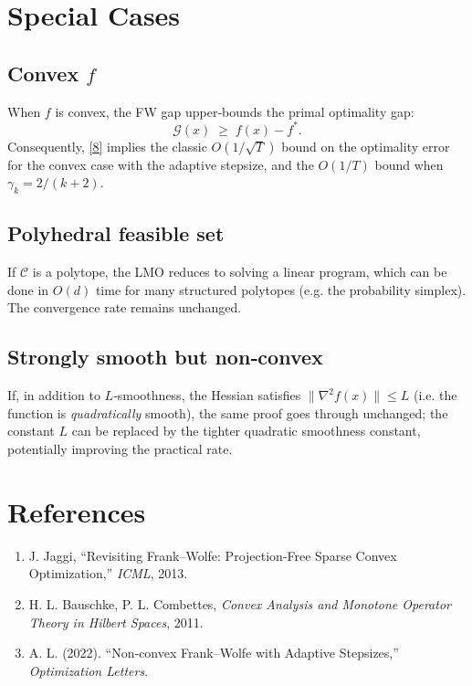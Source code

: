 \documentclass[11pt]{article}
\begin{document}
\section{Special Cases}
\label{sec:special}
\subsection*{Convex $f$}
When $f$ is convex, the FW gap upper‑bounds the primal optimality gap:
\[
\mathcal G(x) \;\ge\; f(x)-f^{*}.
\]
Consequently, \eqref{8} implies the classic $O(1/\sqrt{T})$ bound on the
optimality error for the convex case with the adaptive stepsize, and the
$O(1/T)$ bound when $\gamma_{k}=2/(k+2)$.

\subsection*{Polyhedral feasible set}
If $\mathcal C$ is a polytope, the LMO reduces to solving a linear program,
which can be done in $O(d)$ time for many structured polytopes (e.g. the
probability simplex).  The convergence rate remains unchanged.

\subsection*{Strongly smooth but non‑convex}
If, in addition to $L$‑smoothness, the Hessian satisfies
$\|\nabla^{2}f(x)\|\le L$ (i.e. the function is \emph{quadratically}
smooth), the same proof goes through unchanged; the constant $L$ can be
replaced by the tighter quadratic smoothness constant, potentially improving
the practical rate.

\section*{References}
\begin{enumerate}
\item J. Jaggi, “Revisiting Frank–Wolfe: Projection‑Free Sparse Convex Optimization,” \emph{ICML}, 2013.
\item H. L. Bauschke, P. L. Combettes, \emph{Convex Analysis and Monotone Operator Theory in Hilbert Spaces}, 2011.
\item A. L. (2022). “Non‑convex Frank–Wolfe with Adaptive Stepsizes,” \emph{Optimization Letters}.
\end{enumerate}
\end{document}
